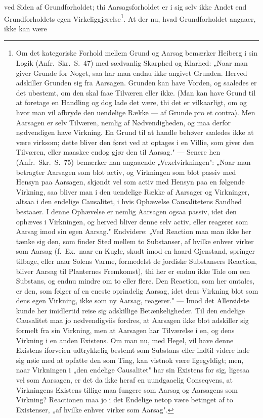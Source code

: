 \documentclass[12pt]{book}
\newcommand{\opage}[1]{\marginnote{\footnotesize\textit{[#1]}}}
\begin{document}
ved Siden af Grundforholdet; thi Aarsagsforholdet er i sig selv ikke Andet end
Grundforholdets egen Virkeliggjørelse\footnote{Om det kategoriske Forhold mellem Grund og
Aarsag bemærker Heiberg i sin Logik (Anfr.\ Skr.\ S.~47) med sædvanlig Skarphed og
Klarhed: „Naar man giver Grunde for Noget, saa har man endnu ikke angivet Grunden. Herved
adskiller Grunden sig fra Aarsagen. Grunden kan have Vorden, og saaledes er det ubestemt,
om den skal faae Tilværen eller ikke. (Man kan have Grund til at foretage en Handling og
dog lade det være, thi det er vilkaarligt, om og hvor man vil afbryde den uendelige Række
--- af Grunde pro et contra). Men Aarsagen er selv Tilværen, nemlig af Nødvendigheden, og
maa derfor nødvendigen have Virkning. En Grund til at handle behøver saaledes ikke at
være virksom; dette bliver den først ved at optages i en Villie, som giver den Tilværen,
eller maaskee endog gjør den til Aarsag." --- Senere hen (Anfr.\ Skr.\ S.~75) bemærker
han angaaende „Vexelvirkningen": „Naar man betragter Aarsagen som blot activ, og
Virkningen som blot passiv med Hensyn paa Aarsagen, skjøndt vel som activ med Hensyn paa
\opage{119} en følgende Virkning, saa bliver man i den uendelige Række af Aarsager og Virkninger,
altsaa i den endelige Causalitet, i hvis Ophævelse Causalitetens Sandhed bestaaer. I
denne Ophævelse er nemlig Aarsagen ogsaa passiv, idet den ophæves i Virkningen, og herved
bliver denne selv activ, eller reagerer som Aarsag imod sin egen Aarsag." Endvidere: „Ved
Reaction maa man ikke her tænke sig den, som finder Sted mellem to Substanser, af hvilke
enhver virker som Aarsag (f.\ Ex.\ naar en Kugle, skudt imod en haard Gjenstand, springer
tilbage, eller naar Solens Varme, formedelst de jordiske Substansers Reaction, bliver
Aarsag til Planternes Fremkomst), thi her er endnu ikke Tale om een Substans, og endnu
mindre om to eller flere. Den Reaction, som her omtales, er den, som følger af en eneste
oprindelig Aarsag, idet dens Virkning blot som dens egen Virkning, ikke som ny Aarsag,
reagerer." --- Imod det Allersidste kunde her imidlertid reise sig adskillige
Betænkeligheder. Til den endelige Causalitet maa jo nødvendigviis fordres, at Aarsagen
ikke blot adskiller sig formelt fra sin Virkning, men at Aarsagen har Tilværelse i en, og
dens Virkning i en anden Existens. Om man nu, med Hegel, vil have denne Existens iforveien
udtrykkelig bestemt som Substans eller indtil videre lade sig nøie med at opfatte den som
Ting, kan vistnok være ligegyldigt; men, naar Virkningen i „den endelige Causalitet" har
sin Existens for sig, ligesaa vel som Aarsagen, er det da ikke heraf en uundgaaelig
Conseqvens, at Virkningens Existens tillige maa fungere som Aarsag og Aarsagens som
Virkning? Reactionen maa jo i det Endelige netop være betinget af to Existenser, „af
hvilke enhver virker som Aarsag".}. At der nu, hvad Grundforholdet angaaer, ikke kan være
\end{document}
